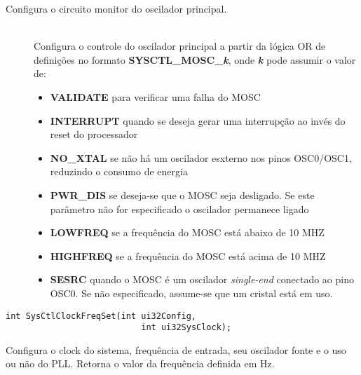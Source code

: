 Configura o circuito monitor do oscilador principal.

\begin{description}
	\item []\hfill \\
	Configura o controle do oscilador principal a partir da lógica OR de definições no formato \textbf{SYSCTL\_MOSC\_\emph{k}}, onde \textbf{\emph{k}} pode assumir o valor de:
	\begin{itemize}
		\item \textbf{VALIDATE} para verificar uma falha do MOSC
		\item \textbf{INTERRUPT} quando se deseja gerar uma interrupção ao invés do reset do processador
		\item \textbf{NO\_XTAL} se não há um oscilador esxterno nos pinos OSC0/OSC1, reduzindo o consumo de energia
		\item \textbf{PWR\_DIS} se deseja-se que o MOSC seja desligado. Se este parâmetro não for especificado o oscilador permanece ligado
		\item \textbf{LOWFREQ} se a frequência do MOSC está abaixo de 10 MHZ
		\item \textbf{HIGHFREQ} se a frequência do MOSC está acima de 10 MHZ
		\item \textbf{SESRC} quando o MOSC é um oscilador \emph{single-end} conectado ao pino OSC0. Se não especificado, assume-se que um cristal está em uso.
	\end{itemize}

\end{description}


\begin{lstlisting}[style=funcao]
	int SysCtlClockFreqSet(int ui32Config,
						   int ui32SysClock);
\end{lstlisting}

Configura o clock do sistema, frequência de entrada, seu oscilador fonte e o uso ou não do PLL. Retorna o valor da frequência definida em Hz.

